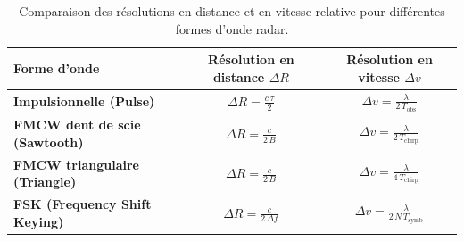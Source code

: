 \begin{table}[h!]
\centering
\caption{Comparaison des résolutions en distance et en vitesse relative pour différentes formes d’onde radar.}
\label{tab:resolutions}
\renewcommand{\arraystretch}{1.3}
\begin{tabular}{|l|c|c|}
\hline
\textbf{Forme d’onde} & \textbf{Résolution en distance $\Delta R$} & \textbf{Résolution en vitesse $\Delta v$} \\
\hline
\textbf{Impulsionnelle (Pulse)} 
& $\displaystyle \Delta R = \frac{c\,\tau}{2}$ 
& $\displaystyle \Delta v = \frac{\lambda}{2\,T_{\text{obs}}}$ \\ 
\hline
\textbf{FMCW dent de scie (Sawtooth)} 
& $\displaystyle \Delta R = \frac{c}{2\,B}$ 
& $\displaystyle \Delta v = \frac{\lambda}{2\,T_{\text{chirp}}}$ \\
\hline
\textbf{FMCW triangulaire (Triangle)} 
& $\displaystyle \Delta R = \frac{c}{2\,B}$ 
& $\displaystyle \Delta v = \frac{\lambda}{4\,T_{\text{chirp}}}$ \\
\hline
\textbf{FSK (Frequency Shift Keying)} 
& $\displaystyle \Delta R = \frac{c}{2\,\Delta f}$ 
& $\displaystyle \Delta v = \frac{\lambda}{2\,N\,T_{\text{symb}}}$ \\
\hline
\end{tabular}
\end{table}
